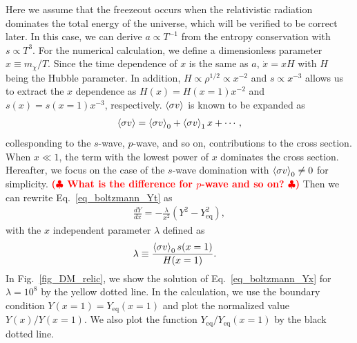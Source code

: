 \documentclass[12pt,twoside,book]{article}
\def\rem#1{ {\bf\textcolor{red}{($\clubsuit$ #1 $\clubsuit$)}}}
\begin{document}
Here we assume that the freezeout occurs when the relativistic radiation
dominates the total energy of the universe, which will be verified to be
correct later.  In this case, we can derive $a \propto T^{-1}$ from the
entropy conservation with $s \propto T^3$.  For the numerical
calculation, we define a dimensionless parameter $x \equiv m_\chi / T$.
Since the time dependence of $x$ is the same as $a$, $\dot{x} = x H$
with $H$ being the Hubble parameter.  In addition, $H \propto \rho^{1/2}
\propto x^{-2}$ and $s \propto x^{-3}$ allows us to extract the $x$
dependence as $H(x) = H(x=1) x^{-2}$ and $s(x) = s(x=1) x^{-3}$,
respectively.  $\Braket{\sigma v}$ is known to be expanded
as~\cite{Gondolo:1990dk}
\begin{align}
 \Braket{\sigma v} = \Braket{\sigma v}_0 +
 \Braket{\sigma v}_1 x + \cdots,
\end{align}
collesponding to the $s$-wave, $p$-wave, and so on, contributions to the
cross section.  When $x \ll 1$, the term with the lowest power of $x$
dominates the cross section.  Hereafter, we focus on the case of the
$s$-wave domination with $\Braket{\sigma v}_0 \neq 0$ for simplicity.
\rem{What is the difference for $p$-wave and so on?}  Then we can
rewrite Eq.~\eqref{eq_boltzmann_Yt} as
\begin{align}
 \frac{d Y}{d x} = -\frac{\lambda}{x^2} (Y^2 - Y_{\mathrm{eq}}^2),\label{eq_boltzmann_Yx}
\end{align}
with the $x$ independent parameter $\lambda$ defined as
\begin{align}
 \lambda &\equiv \frac{\Braket{\sigma v}_0 s(x=1)}{H(x=1)}.\label{eq_lambda}
\end{align}
In Fig.~\ref{fig_DM_relic}, we show the solution of
Eq.~\eqref{eq_boltzmann_Yx} for $\lambda = 10^8$ by the yellow dotted
line.  In the calculation, we use the boundary condition $Y(x=1) =
Y_{\mathrm{eq}} (x=1)$ and plot the normalized value $Y(x) / Y(x=1)$.
We also plot the function $Y_{\mathrm{eq}} / Y_{\mathrm{eq}} (x=1)$ by
the black dotted line.
\end{document}
